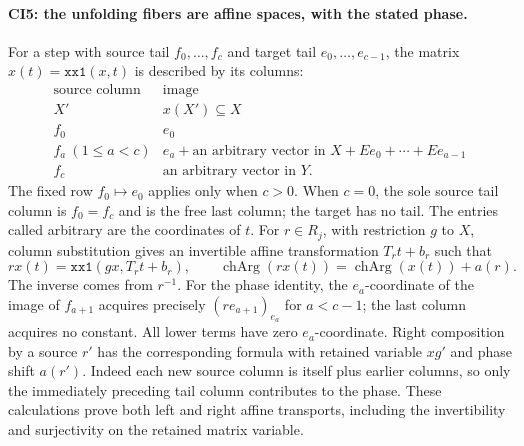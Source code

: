 \paragraph{CI5: the unfolding fibers are affine spaces, with the stated phase.}
For a step with source tail $f_0,\ldots,f_c$ and target tail
$e_0,\ldots,e_{c-1}$, the matrix $x(t)=\texttt{xx1}(x,t)$ is
described by its columns:
\[
 \begin{array}{c|c}
 \text{source column}&\text{image}\\ \hline
 X'&x(X')\subseteq X\\
 f_0&e_0\\
 f_a\ (1\le a<c)&e_a+\text{an arbitrary vector in }
             X+Ee_0+\cdots+Ee_{a-1}\\
 f_c&\text{an arbitrary vector in }Y.
 \end{array}
 \tag{CI.9}
\]
The fixed row $f_0\mapsto e_0$ applies only when $c>0$.
When $c=0$, the sole source tail column is $f_0=f_c$ and is
the free last column; the target has no tail. The entries
called arbitrary are the coordinates of $t$.
For $r\in R_j$, with restriction $g$ to $X$, column substitution
gives an invertible affine transformation $T_rt+b_r$ such that
\[
 r x(t)=\texttt{xx1}(gx,T_rt+b_r),\qquad
 \operatorname{chArg}(r x(t))=
       \operatorname{chArg}(x(t))+a(r).
 \tag{CI.10}
\]
The inverse comes from $r^{-1}$. For the phase identity, the
$e_a$-coordinate of the image of $f_{a+1}$ acquires precisely
$(r e_{a+1})_{e_a}$ for $a<c-1$; the last column acquires no
constant. All lower terms have zero $e_a$-coordinate.
Right composition by a source $r'$ has the corresponding formula
with retained variable $xg'$ and phase shift $a(r')$. Indeed
each new source column is itself plus earlier columns, so only
the immediately preceding tail column contributes to the phase.
These calculations prove both left and right affine transports,
including the invertibility and surjectivity on the retained
matrix variable.


